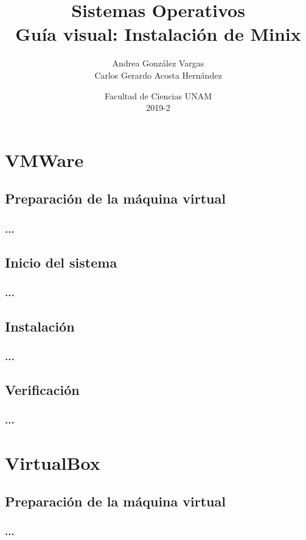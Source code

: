 \documentclass[12pt]{article}
\title{Sistemas Operativos\\ Guía visual: Instalación de Minix}
\author{Andrea González Vargas\\Carlos Gerardo Acosta Hernández}
\date{Facultad de Ciencias UNAM \\ 2019-2}
\begin{document}
\maketitle

\section{VMWare}

\subsection*{Preparación de la máquina virtual}
\subsubsection*{...}

\subsection*{Inicio del sistema}
\subsubsection*{...}

\subsection*{Instalación}
\subsubsection*{...}

\subsection*{Verificación}
\subsubsection*{...}


\section{VirtualBox}

\subsection*{Preparación de la máquina virtual}
\subsubsection*{...}
\end{document}
